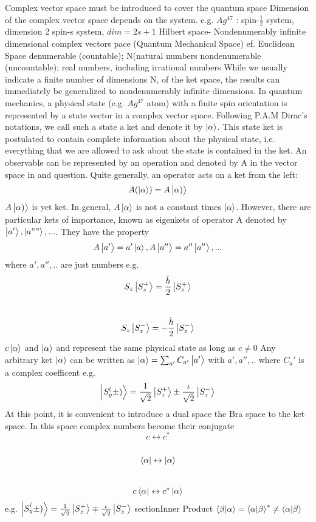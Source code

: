 \documentclass{article}
\begin{document}
Complex vector space must be introduced to cover the quantum space
Dimension of the complex vector space depends on the system. 
e.g. $ Ag^47 $ : spin-$ \frac{1}{2} $ system, dimension 2
spin-s system, $dim = 2s+1 $
Hilbert space- Nondenumerably infinite dimensional complex vectors pace (Quantum Mechanical Space)
ef. Euclidean Space
denumerable (countable); N(natural numbers
nondenumerable (uncountable); real numbers, including irrational numbers
While we usually indicate a finite number of dimensions N, of the ket space, the results can immediately be generalized to nondenumerably infinite dimensions. In quantum mechanics, a physical state (e.g. $Ag^47$ atom) with a finite spin orientation is represented by a state vector in a complex vector space. Following P.A.M Dirac's notations, we call such a state a ket and denote it by $\ket{ \alpha }$. This state ket is postulated to contain complete information about the physical state, i.e. everything that we are allowed to ask about the state is contained in the ket.
An observable can be represented by an operation and denoted by A in the vector space in and question. Quite generally, an operator acts on a ket from the left:
$$
A(\ket{\alpha}) = A\ket{\alpha)}
$$
$A\ket{\alpha)}$ is yet  ket. In general, $A\ket{\alpha}$ is not a constant times $\ket{\alpha}$. However, there are particular kets of importance, known as eigenkets of operator A denoted by $\ket{a'}, \ket{a""},...$. They have the property
$$
A\ket{a'} = a'\ket{a}, A\ket{a''} = a''\ket{a''},...
$$
where $a',a'',..$ are just numbers
e.g.
$$
S_z\ket{S_z^+} = \frac{\bar{h}}{2}\ket{S_z^+}
$$ \\ $$
S_z\ket{S_z^-} = -\frac{\bar{h}}{2}\ket{S_z^-}
$$
$c\ket{\alpha}$ and $\ket{\alpha}$ and represent the same physical state as long as $c \neq 0$
Any arbitrary ket $\ket{\alpha}$ can be written as $\ket{\alpha} = \sum_{a'} C_{a'}\ket{a'}$ with $a', a'',..$ where $C_a'$ is a complex coefficent
e.g. $$
\ket{S_y^(\pm)} = \frac{1}{\sqrt{2}}\ket{S_z^+} \pm \frac{ \iota }{ \sqrt{2} } \ket{ S_z^- }
$$
At this point, it is convenient to introduce a dual space the Bra space to the ket space. In this space complex numbers become their conjugate
$$
c \leftrightarrow c^* 
$$ \\ $$
\bra{ \alpha } \leftrightarrow \ket{ \alpha }
$$ \\ $$
c \bra{ \alpha } \leftrightarrow c^* \ket{ \alpha }
$$
e.g. $\ket{S_y^(\pm)} = \frac{1}{ \sqrt{2} } \ket{S_z^+} \mp \frac{ \iota} { \sqrt{2} } \ket{S_z^-}$
section{Inner Product}
$\braket{\beta}{\alpha} = \braket{\alpha}{\beta}^* \neq \braket{\alpha}{\beta}$ \\
\end{document}
